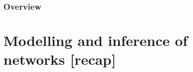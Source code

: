 \documentclass[8pt]{beamer}
\begin{document}
\begin{frame}
\frametitle{Overview}
\tableofcontents[hideallsubsections]
\end{frame}




\section{Modelling and inference of networks [recap]}

\bgroup
{}
\begin{frame}[plain]{}
\begin{center}
\color{white}{\Huge\insertsection}
\end{center}
\end{frame}
\egroup

\end{document}
